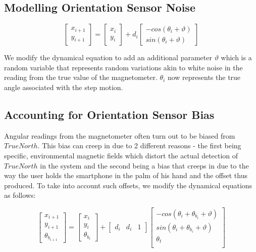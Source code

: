\documentclass[10pt,journal,letterpaper,compsoc]{IEEEtran}
\begin{document}
\subsection{Modelling Orientation Sensor Noise}

\begin{equation}
\begin{bmatrix}x_{i+1}\\
y_{i+1}
\end{bmatrix} = \begin{bmatrix}x_{i}\\
y_{i}
\end{bmatrix}  + d{}_{i} \begin{bmatrix}-cos(\theta_{i}+\vartheta)\\
sin(\theta_{i}+\vartheta)
\end{bmatrix} 
\end{equation}

We modify the dynamical equation to add an additional parameter $\vartheta$
which is a random variable that represents random variations akin to white noise
in the reading from the true value of the magnetometer. $\theta_i$ now
represents the true angle associated with the step motion.

\subsection{Accounting for Orientation Sensor Bias\label{sec:angle_bias}}

Angular readings from the magnetometer often turn out to be biased from
$TrueNorth$. This bias can creep in due to 2 different reasons - the first being
specific, environmental magnetic fields which distort the actual detection of
$TrueNorth$ in the system and the second being a bias that creeps in due to the
way the user holds the smartphone in the palm of his hand and the offset thus
produced. To take into account such offsets, we modify the dynamical equations
as follows:

\begin{equation}
\begin{bmatrix}x_{i+1}\\
y_{i+1}\\
\theta_{b_{i+1}}
\end{bmatrix} = \begin{bmatrix}x_{i}\\
y_{i}\\
\theta_{b_i}
\end{bmatrix}  + \begin{bmatrix} d{}_{i} & d_i & 1 \end{bmatrix} \begin{bmatrix}-cos(\theta_{i}+\theta_{b_i}+\vartheta)\\
sin(\theta_{i}+\theta_{b_i}+\vartheta)\\
\theta_t\\
\end{bmatrix} 
\end{equation}
\end{document}
